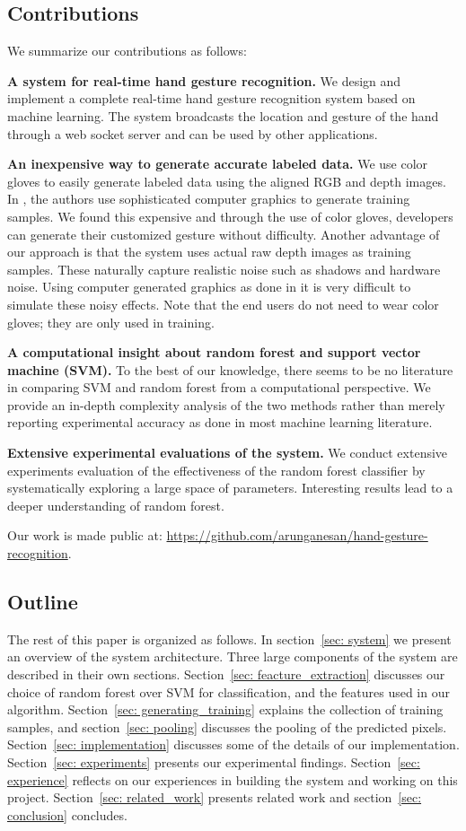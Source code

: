 \cutsection
\subsection{Contributions}
\cutsection
We summarize our contributions as follows:

\textbf{A system for real-time hand gesture recognition.} We design and implement a complete real-time hand gesture recognition system based on machine learning. The system broadcasts the location and gesture of the hand through a web socket server and can be used by other applications.

\textbf{An inexpensive way to generate accurate labeled data.} We use color gloves to easily generate labeled data using the aligned RGB and depth images. In \cite{shotton2011}, the authors use sophisticated computer graphics to generate training samples. We found this expensive and through the use of color gloves, developers can generate their customized gesture without difficulty. Another advantage of our approach is that the system uses actual raw depth images as training samples. These naturally capture realistic noise such as shadows and hardware noise. Using computer generated graphics as done in \cite{shotton2011} it is very difficult to simulate these noisy effects. Note that the end users do not need to wear color gloves; they are only used in training.

\textbf{A computational insight about random forest and support vector machine (SVM).} To the best of our knowledge, there seems to be no literature in comparing SVM and random forest from a computational perspective. We provide an in-depth complexity analysis of the two methods rather than merely reporting experimental accuracy as done in most machine learning literature. 

\textbf{Extensive experimental evaluations of the system.} We conduct extensive experiments evaluation of the effectiveness of the random forest classifier by systematically exploring a large space of parameters. Interesting results lead to a deeper understanding of random forest. 

Our work is made public at: \url{https://github.com/arunganesan/hand-gesture-recognition}.

\cutsection
\subsection{Outline}
\cutsection
The rest of this paper is organized as follows. In section~\ref{sec: system} we present an overview of the system architecture. Three large components of the system are described in their own sections. Section~\ref{sec: feacture_extraction} discusses our choice of random forest over SVM for classification, and the features used in our algorithm. Section~\ref{sec: generating_training} explains the collection of training samples, and section~\ref{sec: pooling} discusses the pooling of the predicted pixels. Section~\ref{sec: implementation} discusses some of the details of our implementation. Section~\ref{sec: experiments} presents our experimental findings. Section~\ref{sec: experience} reflects on our experiences in building the system and working on this project. Section~\ref{sec: related_work} presents related work and section~\ref{sec: conclusion} concludes. 
